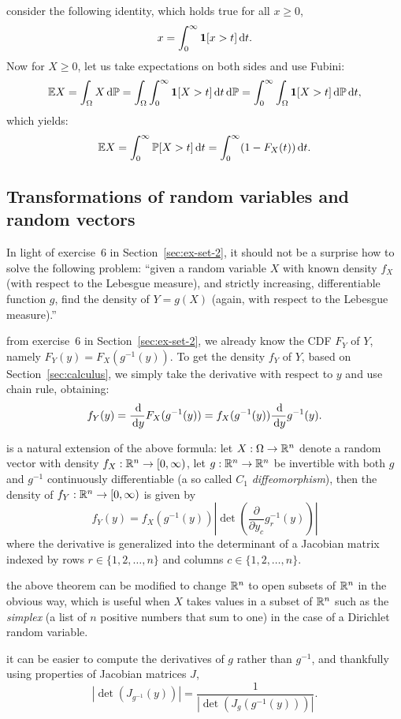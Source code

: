 \documentclass{article}
\begin{document}
 consider the following identity, which holds true for all $x \ge 0$, 
\[ x = \int_0^\infty {\mathbf 1}[x > t] \,\mathrm{d} t. \]
Now for $X \ge 0$, let us take expectations on both sides and use Fubini:
\[ {\mathbb E} X = \int_\Omega X \,\mathrm{d} {\mathbb P} = \int_\Omega \int_0^\infty {\mathbf 1}[X > t] \,\mathrm{d} t \,\mathrm{d} {\mathbb P} =  \int_0^\infty \int_\Omega {\mathbf 1}[X > t] \,\mathrm{d} {\mathbb P}  \,\mathrm{d} t, \]
which yields:
\[ {\mathbb E} X = \int_0^\infty {\mathbb P}[X > t] \,\mathrm{d} t = \int_0^\infty (1 - F_X(t))  \,\mathrm{d} t. \]


\subsection{Transformations of random variables and random vectors}

 In light of exercise~6 in Section~\ref{sec:ex-set-2}, it should not be a surprise how to solve the following problem: ``given a random variable $X$ with known density $f_X$ (with respect to the Lebesgue measure), and strictly increasing, differentiable function $g$, find the density of $Y=g(X)$ (again, with respect to the Lebesgue measure).''

 from exercise~6 in Section~\ref{sec:ex-set-2}, we already know the CDF $F_Y$ of $Y$, namely $F_Y(y) = F_X(g^{-1}(y))$. To get the density $f_Y$ of $Y$, based on Section~\ref{sec:calculus}, we simply take the derivative with respect to $y$ and use chain rule, obtaining:
\[ f_Y(y) = \frac{\,\mathrm{d}}{\,\mathrm{d} y} F_X(g^{-1}(y)) = f_X(g^{-1}(y)) \frac{\,\mathrm{d}}{\,\mathrm{d} y} g^{-1}(y). \]

 is a natural extension of the above formula: let $X : \Omega \to {\mathbb R}^n$ denote a random vector with density $f_X : {\mathbb R}^n \to [0, \infty)$, let $g : {\mathbb R}^n \to {\mathbb R}^n$ be invertible with both $g$ and $g^{-1}$ continuously differentiable (a so called $C_1$ \emph{diffeomorphism}), then the density of $f_Y : {\mathbb R}^n \to [0, \infty)$ is given by
\[ f_Y(y) = f_X(g^{-1}(y)) \left| \det \left( \frac{\partial}{\partial y_c} g_r^{-1}(y) \right) \right| \]
where the derivative is generalized into the determinant of a Jacobian matrix indexed by rows $r \in \{1, 2, \dots, n\}$ and columns $c \in \{1, 2, \dots, n\}$. 

 the above theorem can be modified to change ${\mathbb R}^n$ to open subsets of ${\mathbb R}^n$ in the obvious way, which is useful when $X$ takes values in a subset of ${\mathbb R}^n$ such as the \emph{simplex} (a list of $n$ positive numbers that sum to one) in the case of a Dirichlet random variable. 

 it can be easier to compute the derivatives of $g$ rather than $g^{-1}$, and thankfully using properties of Jacobian matrices $J$,
\[  \left| \det \left( J_{g^{-1}}(y)  \right) \right| = \frac{1}{\left| \det \left( J_g(g^{-1}(y)) \right) \right|}. \]
\end{document}
